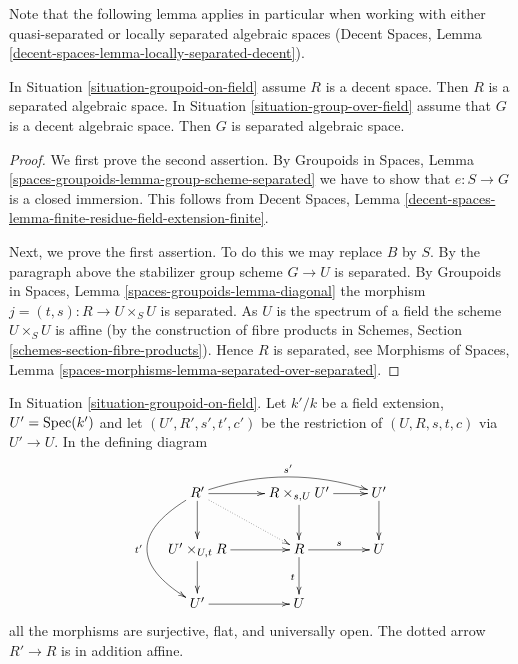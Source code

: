 \noindent
Note that the following lemma applies in particular when working
with either quasi-separated or locally separated algebraic spaces
(Decent Spaces, Lemma \ref{decent-spaces-lemma-locally-separated-decent}).

\begin{lemma}
\label{lemma-group-scheme-over-field-separated}
In Situation \ref{situation-groupoid-on-field}
assume $R$ is a decent space. Then $R$ is a separated algebraic space.
In Situation \ref{situation-group-over-field} assume that
$G$ is a decent algebraic space. Then $G$ is separated algebraic space.
\end{lemma}

\begin{proof}
We first prove the second assertion. By Groupoids in Spaces,
Lemma \ref{spaces-groupoids-lemma-group-scheme-separated}
we have to show that $e : S \to G$ is a closed immersion.
This follows from Decent Spaces, Lemma
\ref{decent-spaces-lemma-finite-residue-field-extension-finite}.

\medskip\noindent
Next, we prove the first assertion. To do this we may replace $B$ by $S$.
By the paragraph above the stabilizer group scheme $G \to U$ is separated. By
Groupoids in Spaces, Lemma \ref{spaces-groupoids-lemma-diagonal}
the morphism $j = (t, s) : R \to U \times_S U$ is separated.
As $U$ is the spectrum of a field the scheme
$U \times_S U$ is affine (by the construction of fibre products in
Schemes, Section \ref{schemes-section-fibre-products}).
Hence $R$ is separated, see
Morphisms of Spaces, Lemma
\ref{spaces-morphisms-lemma-separated-over-separated}.
\end{proof}

\begin{lemma}
\label{lemma-restrict-groupoid-on-field}
In
Situation \ref{situation-groupoid-on-field}.
Let $k'/k$ be a field extension, $U' = \mathop{\mathrm{Spec}}(k')$
and let $(U', R', s', t', c')$ be the restriction of
$(U, R, s, t, c)$ via $U' \to U$. In the defining diagram
$$
\xymatrix{
R' \ar[d] \ar[r] \ar@/_3pc/[dd]_{t'} \ar@/^1pc/[rr]^{s'} \ar@{..>}[rd] &
R \times_{s, U} U' \ar[r] \ar[d] &
U' \ar[d] \\
U' \times_{U, t} R \ar[d] \ar[r] &
R \ar[r]^s \ar[d]_t &
U \\
U' \ar[r] &
U
}
$$
all the morphisms are surjective, flat, and universally open.
The dotted arrow $R' \to R$ is in addition affine.
\end{lemma}

